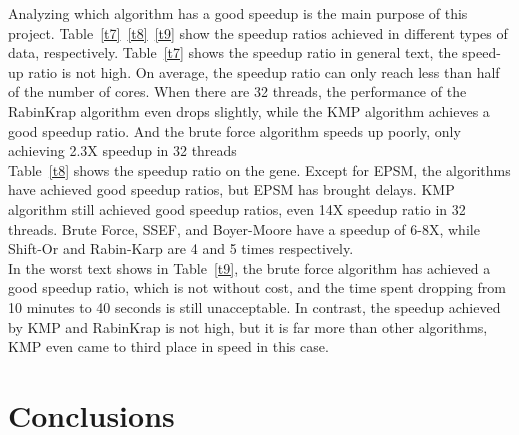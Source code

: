 \documentclass[11pt]{article}       %
\newcommand{\includeFig}[3]      {\begin{figure}[htb] \begin{center}
                                 \includegraphics
                                 [width=4in,keepaspectratio] %
                                 {#2}\caption{\label{#1}#3} \end{center} \end{figure}}
\begin{document}
Analyzing which algorithm has a good speedup is the main purpose of this project. Table~\ref{t7}~\ref{t8}~\ref{t9} show the speedup ratios achieved in different types of data, respectively. Table~\ref{t7} shows the speedup ratio in general text, the speed-up ratio is not high. On average, the speedup ratio can only reach less than half of the number of cores. When there are 32 threads, the performance of the RabinKrap algorithm even drops slightly, while the KMP algorithm achieves a good speedup ratio. And the brute force algorithm speeds up poorly, only achieving 2.3X speedup in 32 threads\\ 
Table~\ref{t8} shows the speedup ratio on the gene. Except for EPSM, the algorithms have achieved good speedup ratios, but EPSM has brought delays. KMP algorithm still achieved good speedup ratios, even 14X speedup ratio in 32 threads. Brute Force, SSEF, and Boyer-Moore have a speedup of 6-8X, while Shift-Or and Rabin-Karp are 4 and 5 times respectively.\\
In the worst text shows in Table~\ref{t9}, the brute force algorithm has achieved a good speedup ratio, which is not without cost, and the time spent dropping from 10 minutes to 40 seconds is still unacceptable. In contrast, the speedup achieved by KMP and RabinKrap is not high, but it is far more than other algorithms, KMP even came to third place in speed in this case.






\section{Conclusions} \label{concl}
\end{document}
